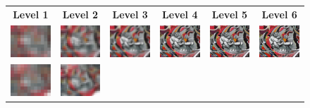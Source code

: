 \begin{figure}
    \setlength\tabcolsep{2.5pt}
    \begin{center}
        \begin{tabular}{c c c c c c}
        \textbf{Level 1} & \textbf{Level 2} & \textbf{Level 3} & \textbf{Level 4} & \textbf{Level 5} & \textbf{Level 6} \\
        \includegraphics[width=1.8cm]{main/chapter03/data/homography/img_src_1.jpg} &
        \includegraphics[width=1.8cm]{main/chapter03/data/homography/img_src_2.jpg} &
        \includegraphics[width=1.8cm]{main/chapter03/data/homography/img_src_3.jpg} &
        \includegraphics[width=1.8cm]{main/chapter03/data/homography/img_src_4.jpg} &
        \includegraphics[width=1.8cm]{main/chapter03/data/homography/img_src_5.jpg} &
        \includegraphics[width=1.8cm]{main/chapter03/data/homography/img_src_7.jpg} \\
        \includegraphics[width=1.8cm]{main/chapter03/data/homography/img_dst_1.jpg} &
        \includegraphics[width=1.8cm]{main/chapter03/data/homography/img_dst_2.jpg} &

\end{tabular}
\end{center}
\end{figure}
